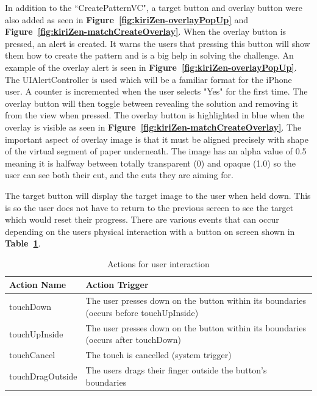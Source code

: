 \documentclass[11pt]{article}
\begin{document}
                    In addition to the ``CreatePatternVC", a target button and overlay button were also added as seen in \textbf{Figure~\ref{fig:kiriZen-overlayPopUp}} and \textbf{Figure~\ref{fig:kiriZen-matchCreateOverlay}}. When the overlay button is pressed, an alert is created. It warns the users that pressing this button will show them how to create the pattern and is a big help in solving the challenge. An example of the overlay alert is seen in \textbf{Figure~\ref{fig:kiriZen-overlayPopUp}}. The UIAlertController is used which will be a familiar format for the iPhone user. A counter is incremented when the user selects "Yes" for the first time. The overlay button will then toggle between revealing the solution and removing it from the view when pressed. The overlay button is highlighted in blue when the overlay is visible as seen in \textbf{Figure~\ref{fig:kiriZen-matchCreateOverlay}}. The important aspect of overlay image is that it must be aligned precisely with shape of the virtual segment of paper underneath. The image has an alpha value of 0.5 meaning it is halfway between totally transparent (0) and opaque (1.0) so the user can see both their cut, and the cuts they are aiming for. 
                    
                    The target button will display the target image to the user when held down. This is so the user does not have to return to the previous screen to see the target which would reset their progress. There are various events that can occur depending on the users physical interaction with a button on screen shown in \textbf{Table~\ref{tab:table2}}.
                    
                    \begin{table}[h!]
                      \begin{center}
                      \caption{Actions for user interaction}
                      \label{tab:table2}
                        \begin{tabular}{|l|p{8cm}|}\hline
                          \textbf{Action Name} & \textbf{Action Trigger}\\\hline
                            touchDown & The user presses down on the button within its boundaries (occurs before touchUpInside) \\\hline
                            touchUpInside & The user presses down on the button within its boundaries (occurs after touchDown) \\\hline
                            touchCancel & The touch is cancelled (system trigger) \\\hline
                            touchDragOutside & The users drags their finger outside the button's boundaries\\\hline
                        \end{tabular}
                      \end{center}
                    \end{table}
                    
\end{document}
